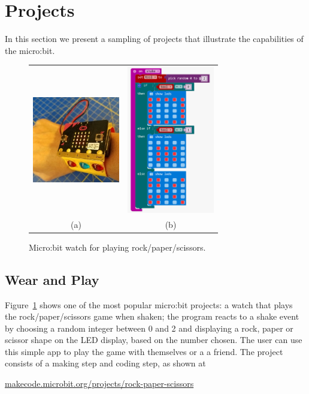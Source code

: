 \section{Projects}
\label{sec:projects}

In this section we present a sampling of projects that 
illustrate the capabilities of the micro:bit. 

\begin{figure}[t] 
    \begin{tabular}{cc}
        \includegraphics[width=1.5in]{images/rock-paper-scissors.jpg}  &
        \includegraphics[width=1.5in]{images/rpsBlocks.png} \\
        (a) & (b) 
      \end{tabular}
    \caption{\label{fig:rps}Micro:bit watch for playing rock/paper/scissors.}
\end{figure}

\subsection{Wear and Play}

Figure~\ref{fig:rps} shows one of the most popular micro:bit projects:
a watch that plays the rock/paper/scissors game when shaken; 
the program reacts to a shake event by choosing a random integer between 0 and 2
and displaying a rock, paper or scissor shape on the LED display, based
on the number chosen. The
user can use this simple app to play the game with themselves or a
a friend. The project consists of a making step and coding step,
as shown at
\begin{center}
\small{\url{makecode.microbit.org/projects/rock-paper-scissors}}
\end{center}

